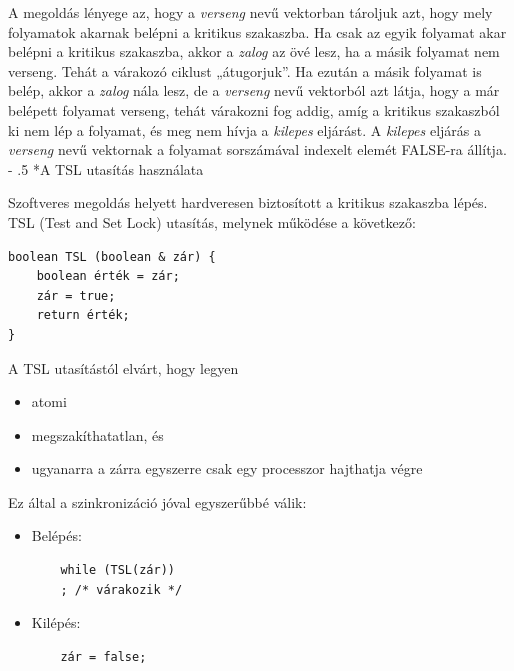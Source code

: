\documentclass[tikz,12pt,margin=0px]{article}
\makeatletter
\renewcommand\paragraph{%
	\@startsection{paragraph}{4}{0mm}%
	{-\baselineskip}%
	{.5\baselineskip}%
	{\normalfont\normalsize\bfseries}}
\makeatother
\begin{document}
    \noindent A megoldás lényege az, hogy a \emph{verseng} nevű vektorban tároljuk azt, hogy mely folyamatok akarnak belépni a kritikus szakaszba. Ha csak az egyik folyamat akar belépni a kritikus szakaszba, akkor a \emph{zalog} az övé lesz, ha a másik folyamat nem verseng. Tehát a várakozó ciklust „átugorjuk”. Ha ezután a másik folyamat is belép, akkor a \emph{zalog} nála lesz, de a \emph{verseng} nevű vektorból azt látja, hogy a már belépett folyamat verseng, tehát várakozni fog addig, amíg a kritikus szakaszból ki nem lép a folyamat, és meg nem hívja a \emph{kilepes} eljárást. A \emph{kilepes} eljárás a \emph{verseng} nevű vektornak a folyamat sorszámával indexelt elemét FALSE-ra állítja.\\

    \paragraph*{A TSL utasítás használata}

    Szoftveres megoldás helyett hardveresen biztosított a kritikus szakaszba lépés.\\

    \noindent TSL (Test and Set Lock) utasítás, melynek működése a következő:
    \begin{verbatim}
boolean TSL (boolean & zár) {
    boolean érték = zár;
    zár = true;
    return érték;
}
    \end{verbatim}

    \noindent A TSL utasítástól elvárt, hogy legyen
        \begin{itemize}
            \item atomi
            \item megszakíthatatlan, és
            \item ugyanarra a zárra egyszerre csak egy processzor hajthatja végre
        \end{itemize}

    \noindent Ez által a szinkronizáció jóval egyszerűbbé válik:
    \begin{itemize}
        \item Belépés:
        \begin{verbatim}
    while (TSL(zár))
    ; /* várakozik */
        \end{verbatim}
        \item Kilépés:
        \begin{verbatim}
    zár = false;
        \end{verbatim}
    \end{itemize}
\end{document}
